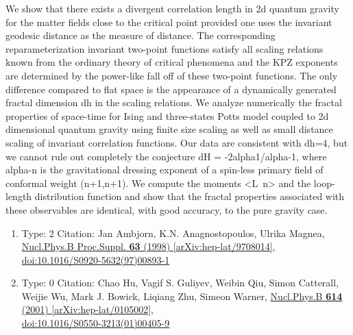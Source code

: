 \documentclass[a4paper,10pt]{article}
\begin{document}
\begin{enumerate}
We show that there exists a divergent correlation length in 2d quantum gravity for the matter fields close to the critical point provided one uses the invariant geodesic distance as the measure of distance. The corresponding reparameterization invariant two-point functions satisfy all scaling relations known from the ordinary theory of critical phenomena and the KPZ exponents are determined by the power-like fall off of these two-point functions. The only difference compared to flat space is the appearance of a dynamically generated fractal dimension dh in the scaling relations. We analyze numerically the fractal properties of space-time for Ising and three-states Potts model coupled to 2d dimensional quantum gravity using finite size scaling as well as small distance scaling of invariant correlation functions. Our data are consistent with dh=4, but we cannot rule out completely the conjecture dH = -2alpha1/alpha{-1}, where alpha{-n} is the gravitational dressing exponent of a spin-less primary field of conformal weight (n+1,n+1). We compute the moments <L~n> and the loop-length distribution function and show that the fractal properties associated with these observables are identical, with good accuracy, to the pure gravity case.
\begin{enumerate}
  \item Type: 2 Citation: Jan Ambjorn, K.N. Anagnostopoulos, Ulrika Magnea, \href{https://www.doi.org/10.1016/S0920-5632(97)00893-1}{Nucl.Phys.B Proc.Suppl. {\bf 63} (1998) }  \href{https://arxiv.org/abs/hep-lat/9708014}{[arXiv:hep-lat/9708014]},\\\href{https://www.doi.org/10.1016/S0920-5632(97)00893-1}{doi:10.1016/S0920-5632(97)00893-1}
  \item Type: 0 Citation: Chao Hu, Vagif S. Guliyev, Weibin Qiu, Simon Catterall, Weijie Wu, Mark J. Bowick, Liqiang Zhu, Simeon Warner, \href{https://www.doi.org/10.1016/S0550-3213(01)00405-9}{Nucl.Phys.B {\bf 614} (2001) }  \href{https://arxiv.org/abs/hep-lat/0105002}{[arXiv:hep-lat/0105002]},\\\href{https://www.doi.org/10.1016/S0550-3213(01)00405-9}{doi:10.1016/S0550-3213(01)00405-9}

\end{enumerate}
\end{enumerate}
\end{document}
